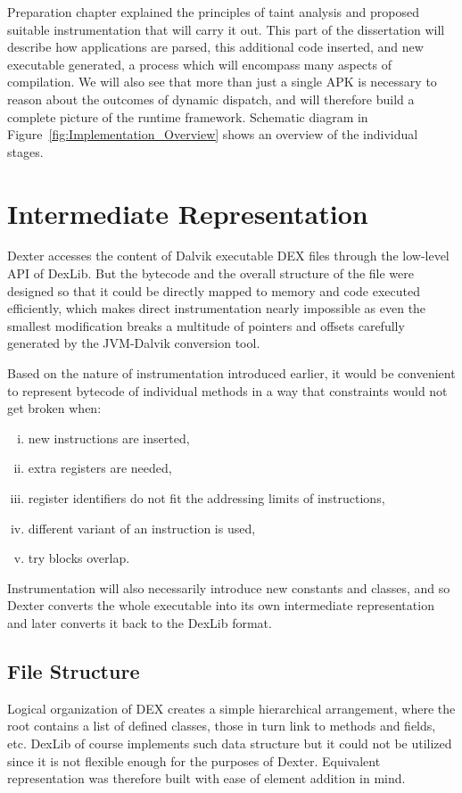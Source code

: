\documentclass[12pt,twoside,notitlepage]{report}
\begin{document}
Preparation chapter explained the principles of taint analysis and proposed suitable instrumentation that will carry it out. This part of the dissertation will describe how applications are parsed, this additional code inserted, and new executable generated, a process which will encompass many aspects of compilation. We will also see that more than just a single APK is necessary to reason about the outcomes of dynamic dispatch, and will therefore build a complete picture of the runtime framework. Schematic diagram in Figure~\ref{fig:Implementation_Overview} shows an overview of the individual stages.

\section{Intermediate Representation}

Dexter accesses the content of Dalvik executable DEX files through the low-level API of DexLib. But the bytecode and the overall structure of the file were designed so that it could be directly mapped to memory and code executed efficiently, which makes direct instrumentation nearly impossible as even the smallest modification breaks a multitude of pointers and offsets carefully generated by the JVM-Dalvik conversion tool.

Based on the nature of instrumentation introduced earlier, it would be convenient to represent bytecode of individual methods in a way that constraints would not get broken when:
\begin{enumerate}[(i)]
\item new instructions are inserted,
\item extra registers are needed,
\item register identifiers do not fit the addressing limits of instructions,
\item different variant of an instruction is used,
\item try blocks overlap.
\end{enumerate}
Instrumentation will also necessarily introduce new constants and classes, and so Dexter converts the whole executable into its own intermediate representation and later converts it back to  the DexLib format.

\subsection{File Structure}

Logical organization of DEX creates a simple hierarchical arrangement, where the root contains a list of defined classes, those in turn link to methods and fields, etc. DexLib of course implements such data structure but it could not be utilized since it is not flexible enough for the purposes of Dexter. Equivalent representation was therefore built with ease of element addition in mind.
\end{document}
